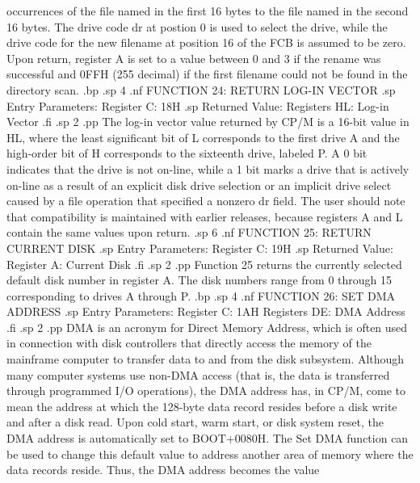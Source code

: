 occurrences of the file named in the first 16 bytes to the file 
named in the second 16 bytes.  The drive code dr at postion 0 is 
used to select the drive, while the drive code for the new 
filename at position 16 of the FCB is assumed to be zero.  Upon 
return, register A is set to a value between 0 and 3 if the 
rename was successful and 0FFH (255 decimal) if the first 
filename could not be found in the directory scan.
.bp
.sp 4
.nf
               FUNCTION 24:  RETURN LOG-IN VECTOR
.sp
               Entry Parameters:
                     Register C:  18H
.sp
               Returned Value:
                   Registers HL:  Log-in Vector
.fi
.sp 2
.pp
The log-in vector value returned by CP/M is a 16-bit value in HL, where the
least significant bit of L corresponds to the first drive A and 
the high-order bit of H corresponds to the sixteenth drive, 
labeled P.  A 0 bit indicates that the drive is not on-line, 
while a 1 bit marks a drive that is actively on-line as a result 
of an explicit disk drive selection or an implicit drive select 
caused by a file operation that specified a nonzero dr field.  
The user should note that compatibility is maintained with 
earlier releases, because registers A and L contain the same values 
upon return.
.sp 6
.nf
                FUNCTION 25:  RETURN CURRENT DISK
.sp
                Entry Parameters:
                      Register C:  19H
.sp
                Returned Value:
                     Register  A:  Current Disk
.fi
.sp 2
.pp
Function 25 returns the currently selected default disk number in 
register A.  The disk numbers range from 0 through 15 
corresponding to drives A through P.
.bp
.sp 4
.nf
                  FUNCTION 26:  SET DMA ADDRESS
.sp
                Entry Parameters:
                      Register C:  1AH
                    Registers DE:  DMA Address
.fi
.sp 2
.pp
DMA is an acronym for Direct Memory Address, which is often used 
in connection with disk controllers that directly access the 
memory of the mainframe computer to transfer data to and from the 
disk subsystem.  Although many computer systems use non-DMA 
access (that is, the data is transferred through programmed I/O 
operations), the DMA address has, in CP/M, come to mean the 
address at which the 128-byte data record resides before a disk 
write and after a disk read.  Upon cold start, warm start, or 
disk system reset, the DMA address is automatically set to 
BOOT+0080H.  The Set DMA function can be used to change 
this default value to address another area of memory where the 
data records reside.  Thus, the DMA address becomes the value 
